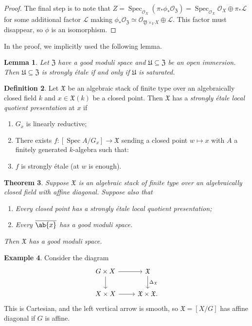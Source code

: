 \documentclass{amsart}
\newtheorem{thm}{Theorem}[section]
\newtheorem{lem}[thm]{Lemma}
\theoremstyle{definition}
\newtheorem{defn}[thm]{Definition}
\newtheorem{exm}[thm]{Example}
\theoremstyle{remark}
\theoremstyle{plain}
\theoremstyle{definition}
\theoremstyle{remark}
\newcommand{\mc}[1]{\mathcal{#1}}
\newcommand{\mf}[1]{\mathfrak{#1}}
\newcommand{\ol}[1]{\overline{#1}}
\newcommand{\1}{\mathbf{1}}
\newcommand{\2}{\mathbf{2}}
\newcommand{\3}{\mathbf{3}}
\DeclareMathOperator{\Spec}{Spec}
\begin{document}
\begin{proof}
    The final step is to note that \(Z = \Spec_{\mc{O}_X}(\pi_*\phi_* \mc{O}_{\mf{Z}}) = \Spec_{\mc{O}_X} \mc{O}_X \oplus \pi_* \mc{L}\) for some additional factor \(\mc{L}\) making \(\phi_* \mc{O}_{\mf{Z}} \simeq \mc{O}_{\mf{Y} \times_Y X} \oplus \mc{L}\). This factor must disappear, so \(\phi\) is an isomorphism.
\end{proof}

In the proof, we implicitly used the following lemma.
\begin{lem}
    Let \(\mf{Z}\) have a good moduli space and \(\mf{U} \subseteq \mf{Z}\) be an open immersion. Then \(\mf{U} \subseteq \mf{Z}\) is strongly \'etale if and only if \(\mf{U}\) is saturated.
\end{lem}

\begin{defn}
    Let \(\mf{X}\) be an algebraic stack of finite type over an algebraically closed field \(k\) and \(x \in \mf{X}(k)\) be a closed point. Then \(\mf{X}\) has a \textit{strongly \'etale local quotient presentation} at \(x\) if
    \begin{enumerate}
        \item \(G_x\) is linearly reductive;
        \item There exists \(f \colon [\Spec A / G_x] \to \mf{X}\) sending a closed point \(w \mapsto x\) with \(A\) a finitely generated \(k\)-algebra such that:
        \item \(f\) is strongly \'etale (at \(w\) is enough).
    \end{enumerate}
\end{defn}

\begin{thm}\label{thm:local-quotient-presentations-imply-global-quotient}
    Suppose \(\mf{X}\) is an algebraic stack of finite type over an algebraically closed field with affine diagonal. Suppose also that
    \begin{enumerate}
        \item Every closed point has a strongly \'etale local quotient presentation;
        \item Every \(\ol{\ab\{x\}}\) has a good moduli space.
    \end{enumerate}
    Then \(\mf{X}\) has a good moduli space.
\end{thm}

\begin{exm}
    Consider the diagram
    \begin{equation*}
    \begin{tikzcd}
        G \times X \ar{r} \ar{d} & \mf{X} \ar{d}{\Delta_{\mf{X}}} \\
        X \times X \ar{r} & \mf{X} \times \mf{X}.
    \end{tikzcd}
    \end{equation*}
    This is Cartesian, and the left vertical arrow is smooth, so \(\mf{X} = [X/G]\) has affine diagonal if \(G\) is affine.
\end{exm}
\end{document}
